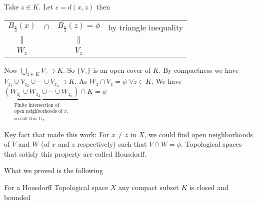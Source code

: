 \begin{myproof}
	Take $z\in K$. Let $c=d(x,z)$ then \begin{center}
		\begin{tabular}{cccl}
			$B_{\frac{c}{3}}(x)$ & $\cap$ & $B_{\frac{c}{3}}(z)=\phi$ & by triangle
			inequality                                                              \\
			$\parallel$          &        & $\parallel$               &             \\
			$W_z$                &        & $V_z$                     &
		\end{tabular}
	\end{center}
	\begin{center}
	\end{center}
	Now $\bigcup\limits_{z\in K}V_z\supset K$. So $\{V_z\}$ is an open cover of $K$.
	By compactness we have $V_{z_1}\cup V_{z_2}\cup \cdots\cup V_{z_n}\supset K$.
	As $W_z\cap V_z=\phi$ $\forall z\in K$.  We have $\underbrace{\left( W_{z_1}\cup
			W_{z_2}\cup \cdots \cup W_{z_n}\right) }_{\substack{\text{Finite intersection
				of}\\ \text{open neighborhoods of } x,\\ \text{so call this }U_x}}\cap K=\phi$
\end{myproof}

Key fact that made this work: For $x\neq z$ in $X$, we could find open neighborhoods of $V$ and $W$ (of $x$ and $z$ respectively) such that $V\cap W=\phi$. Topological spaces that satisfy this property are called \label{housdorff}Housdorff.

What we proved is the following
\begin{Theorem}{}{}
	For a Housdorff Topological space $X$ any compact subset $K$ is closed and bounded
\end{Theorem}


